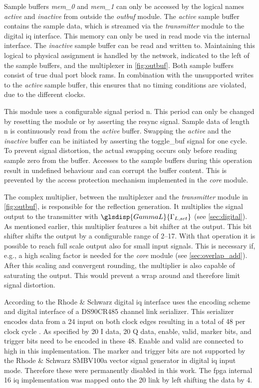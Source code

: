 \documentclass[12pt,a4paper,parskip=full,abstract=true,BCOR=12mm,twoside,open=right]{scrreprt}
\def\device#1{\textit{#1}}
\begin{document}
Sample buffers \device{mem\_0} and \device{mem\_1} can only be accessed by the
logical names \device{active} and \device{inactive} from outside the
\device{outbuf} module. The \device{active} sample buffer contains the sample data,
which is streamed via the \device{transmitter} module to the digital \gls{iq}
interface. This memory can only be used in read mode via the internal interface.
The \device{inactive} sample buffer can be read and written to. Maintaining this
logical to physical assignment is handled by the network, indicated to the left
of the sample buffers, and the multiplexer in \cref{fig:outbuf}. Both sample
buffers consist of true dual port block \glspl{ram}. In combination with the
unsupported writes to the \device{active} sample buffer, this ensures that
no timing conditions are violated, due to the different clocks.

This module uses a configurable signal period \gls{n}. This period can only be changed
by resetting the module or by asserting the resync signal. Sample data of length \gls{n} is
continuously read from the \device{active} buffer. Swapping the \device{active}
and the \device{inactive} buffer can be initiated by asserting the toggle\_buf
signal for one cycle. To prevent signal distortion, the actual swapping occurs
only before reading sample zero from the buffer. Accesses to the sample buffers
during this operation result in undefined behaviour and can corrupt the buffer
content. This is prevented by the access protection mechanism implemented
in the \device{core} module.

The complex multiplier, between the multiplexer and the \device{transmitter}
module in \cref{fig:outbuf}, is responsible for the
reflection generation. It multiplies the signal output to the transmitter
with $\glsdisp{GammaL}{\Gamma_{L,set}}$ (see \cref{sec:digital}). As mentioned earlier, this
multiplier features a bit shifter at the output. This bit shifter shifts the
output by a configurable range of \SIrange{2}{17}{\bit}. With that operation
it is possible to reach full scale output also for small input
signals. This is necessary if, e.g., a high scaling factor is needed
for the \device{core} module (see \cref{sec:overlap_add}). After this scaling
and convergent rounding, the multiplier is also capable of saturating the
output. This would prevent a wrap around and therefore limit signal distortion.

According to \cite{fsq_b17} the Rhode \& Schwarz digital \gls{iq} interface
uses the encoding scheme and digital interface of a DS90CR485 channel link
serializer. This serializer encodes data from a \SI{24}{\bit} input on both
clock edges resulting in a total of \SI{48}{\bit} per clock cycle \cite{ds90cr485}.
As specified by \cite{fsq_b17} \SI{20}{\bit} I data, \SI{20}{\bit} Q data, enable,
valid, marker bits, and trigger bits need to be encoded in these \SI{48}{\bit}. Enable
and valid are connected to high in this implementation. The marker and trigger
bits are not supported by the Rhode \& Schwarz SMBV100a vector signal generator
in digital \gls{iq} input mode. Therefore these were permanently disabled in this
work. The \gls{fpga} internal \SI{16}{\bit} \gls{iq} implementation was mapped
onto the \SI{20}{\bit} link by left shifting the data by \SI{4}{\bit}.
\end{document}
